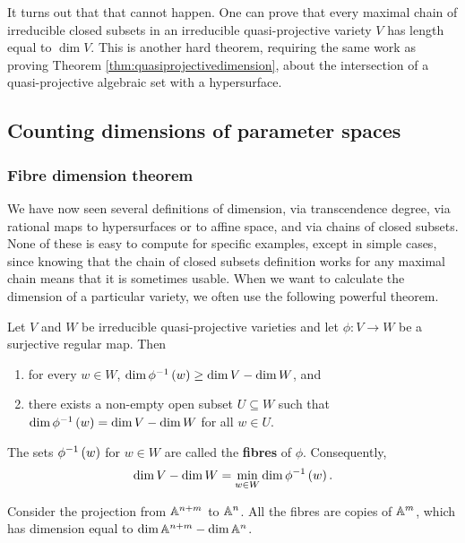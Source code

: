 It turns out that that cannot happen. One can prove that every maximal chain of irreducible closed subsets in an irreducible quasi-projective variety $ V $ has length equal to $ \dim V $. This is another hard theorem, requiring the same work as proving Theorem \ref{thm:quasiprojectivedimension}, about the intersection of a quasi-projective algebraic set with a hypersurface.

\pagebreak

\subsection{Counting dimensions of parameter spaces}

\subsubsection{Fibre dimension theorem}

We have now seen several definitions of dimension, via transcendence degree, via rational maps to hypersurfaces or to affine space, and via chains of closed subsets. None of these is easy to compute for specific examples, except in simple cases, since knowing that the chain of closed subsets definition works for any maximal chain means that it is sometimes usable. When we want to calculate the dimension of a particular variety, we often use the following powerful theorem.

\begin{theorem}
\label{thm:fibredimension}
Let $ V $ and $ W $ be irreducible quasi-projective varieties and let $ \phi : V \to W $ be a surjective regular map. Then
\begin{enumerate}
\item for every $ w \in W $, $ \dim \phi^{-1}\br{w} \ge \dim V - \dim W $, and
\item there exists a non-empty open subset $ U \subseteq W $ such that $ \dim \phi^{-1}\br{w} = \dim V - \dim W $ for all $ w \in U $.
\end{enumerate}
\end{theorem}

The sets $ \phi^{-1}\br{w} $ for $ w \in W $ are called the \textbf{fibres} of $ \phi $. Consequently,
$$ \dim V - \dim W = \min_{w \in W} \dim \phi^{-1}\br{w}. $$

\begin{example*}
Consider the projection from $ \AA^{n + m} $ to $ \AA^n $. All the fibres are copies of $ \AA^m $, which has dimension equal to $ \dim \AA^{n + m} - \dim \AA^n $.
\end{example*}

